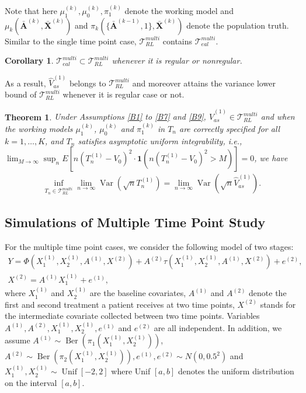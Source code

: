 \documentclass[11pt]{article}
\theoremstyle{referenceplain}
\newtheorem{theorem}{Theorem}
\newtheorem{corollary}{Corollary}[section]
\theoremstyle{referencedefinition}
\theoremstyle{referenceremark}
\begin{document}
Note that here $\mu_1^{(k)},\allowbreak\mu_0^{(k)},\allowbreak\pi_1^{(k)}$ denote the working model and $\mu_k(\bar{\mathbf{A}}^{(k)},\allowbreak\bar{\mathbf{X}}^{(k)})$ and $\pi_k(\{\bar{\mathbf{A}}^{(k-1)},\allowbreak 1\},\allowbreak\bar{\mathbf{X}}^{(k)})$ denote the population truth. Similar to the single time point case, $\mathcal{T}_{RL}^{multi}$ contains $\mathcal{T}_{eal}^{multi}$.
\begin{corollary}\label{hyb-general}
    $\mathcal{T}_{eal}^{multi}\subset\mathcal{T}_{RL}^{multi}$ whenever it is regular or nonregular.
\end{corollary}
As a result, $\widehat{V}_{as}^{(1)}$ belongs to $\mathcal{T}_{RL}^{multi}$ and moreover attains the variance lower bound of $\mathcal{T}_{RL}^{multi}$ whenever it is regular case or not.
\begin{theorem}\label{hyb-var-bound}
     Under Assumptions \ref{B1} to \ref{B7} and \ref{B9}, 
     $\widehat{V}_{as}^{(1)}\in\mathcal{T}_{RL}^{multi}$ and 
     when the working models $\mu_1^{(k)}$, $\mu_0^{(k)}$ and 
     $\pi_1^{(k)}$ in $T_n$ are correctly specified for all 
     $k=1,\dots,K$, and $T_n$ satisfies asymptotic uniform 
     integrability, i.e., 
     $\lim_{M \rightarrow \infty} \sup_n 
     E\left[n\left(T_n^{(1)}-V_0\right)^2 \cdot 
     \mathbf{1}\left(n\left(T_n^{(1)}-V_0\right)^2>M\right)
     \right]=0$, we have
    \begin{align*}
        \inf_{T_n\in\mathcal{T}_{RL}^{multi}}
        \lim_{n\to\infty}\operatorname{Var}(\sqrt{n}T_n^{(1)})
        = \lim_{n\to\infty}\operatorname{Var}
        (\sqrt{n}\widehat{V}_{as}^{(1)}).
    \end{align*}
\end{theorem}

\subsection{Simulations of Multiple Time Point Study}
For the multiple time point cases, we consider the following model of two stages:
\begin{align*}
    Y=\Phi\left(X_{1}^{(1)}, X_{2}^{(1)}, A^{(1)}, X^{(2)}\right)+A^{(2)} \tau\left(X_{1}^{(1)}, X_{2}^{(1)}, A^{(1)}, X^{(2)}\right)+e^{(2)}, \\
X^{(2)}=A^{(1)} X_{1}^{(1)}+e^{(1)},
\end{align*}
where $X_{1}^{(1)}$ and $X_{2}^{(1)}$ are the baseline covariates, $A^{(1)}$ and $A^{(2)}$ denote the first and second treatment a patient receives at two time points, $X^{(2)}$ stands for the intermediate covariate collected between two time points. Variables $A^{(1)}, A^{(2)}, X_{1}^{(1)}, X_{2}^{(1)}, e^{(1)}$ and $e^{(2)}$ are all independent. In addition, we assume $A^{(1)}\sim \operatorname{Ber}(\pi_1(X_{1}^{(1)}, X_{2}^{(1)}))$, $A^{(2)} \sim \operatorname{Ber}(\pi_2(X_{1}^{(1)}, X_{2}^{(1)})), e^{(1)}, e^{(2)} \sim N(0,0.5^2)$ and $X_{1}^{(1)}, X_{2}^{(1)} \sim \operatorname{Unif}[-2,2]$ where Unif $[a, b]$ denotes the uniform distribution on the interval $[a, b]$.
\end{document}
